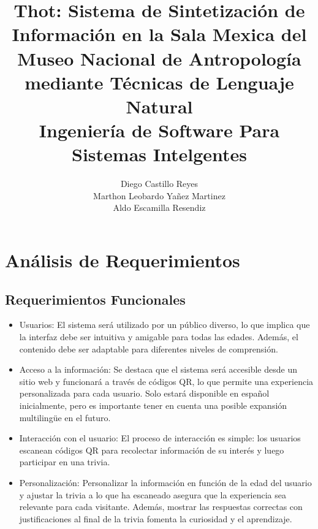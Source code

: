 \documentclass{report}
\title{\Huge{\textbf{Thot: Sistema de Sintetización de Información en la Sala Mexica del Museo Nacional de Antropología mediante Técnicas de Lenguaje Natural}}\\
    \Large{\textbf{Ingeniería de Software Para Sistemas Intelgentes}}}
\author{Diego Castillo Reyes\\Marthon Leobardo Yañez Martinez\\Aldo Escamilla Resendiz}
\begin{document}
        \maketitle
        \tableofcontents
        \newpage
        \justifying 
        \section{Análisis de Requerimientos}
    \subsection*{Requerimientos Funcionales}
    \begin{itemize}
        \item Usuarios: El sistema será utilizado por un público diverso, lo que implica que la interfaz debe ser intuitiva y amigable para todas las edades. Además, el contenido debe ser adaptable para diferentes niveles de comprensión.
        \item Acceso a la información: Se destaca que el sistema será accesible desde un sitio web y funcionará a través de códigos QR, lo que permite una experiencia personalizada para cada usuario. Solo estará disponible en español inicialmente, pero es importante tener en cuenta una posible expansión multilingüe en el futuro.
        \item Interacción con el usuario: El proceso de interacción es simple: los usuarios escanean códigos QR para recolectar información de su interés y luego participar en una trivia.
        \item Personalización: Personalizar la información en función de la edad del usuario y ajustar la trivia a lo que ha escaneado asegura que la experiencia sea relevante para cada visitante. Además, mostrar las respuestas correctas con justificaciones al final de la trivia fomenta la curiosidad y el aprendizaje.
    \end{itemize}
\end{document}
